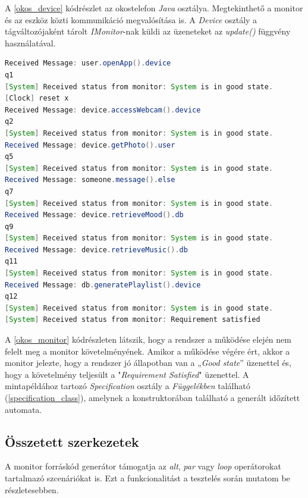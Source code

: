 A \ref{okos_device} kódrészlet az okostelefon \textit{Java} osztálya.
Megtekinthető a monitor és az eszköz közti kommunikáció megvalósítása is.
A \textit{Device} osztály a tágváltozójaként tárolt \textit{IMonitor}-nak küldi az üzeneteket az \textit{update()} függvény használatával.

\begin{lstlisting}[language=java, frame=single, float=ht!, caption={Monitor kimenete a rendszer működésének egyes fázisaiban.},captionpos=b,label=okos_monitor]
Received Message: user.openApp().device
q1
[System] Received status from monitor: System is in good state.
[Clock] reset x
Received Message: device.accessWebcam().device
q2
[System] Received status from monitor: System is in good state.
Received Message: device.getPhoto().user
q5
[System] Received status from monitor: System is in good state.
Received Message: someone.message().else
q7
[System] Received status from monitor: System is in good state.
Received Message: device.retrieveMood().db
q9
[System] Received status from monitor: System is in good state.
Received Message: device.retrieveMusic().db
q11
[System] Received status from monitor: System is in good state.
Received Message: db.generatePlaylist().device
q12
[System] Received status from monitor: System is in good state.
[System] Received status from monitor: Requirement satisfied
\end{lstlisting}

A \ref{okos_monitor} kódrészleten látszik, hogy a rendszer a működése elején nem felelt meg a monitor követelményének.
Amikor a működése végére ért, akkor a monitor jelezte, hogy a rendszer jó állapotban van a „\textit{Good state}” üzenettel és, hogy a követelmény teljesült a "\textit{Requirement Satisfied}" üzenettel.
A mintapéldához tartozó \textit{Specification} osztály a \textit{Függelékben} található (\ref{specification_class}), amelynek a konstruktorában található a generált időzített automata.

\clearpage\subsection{Összetett szerkezetek}

A monitor forráskód generátor támogatja az \textit{alt}, \textit{par} vagy \textit{loop} operátorokat tartalmazó szcenáriókat is.
Ezt a funkcionalitást a tesztelés során mutatom be részletesebben.

